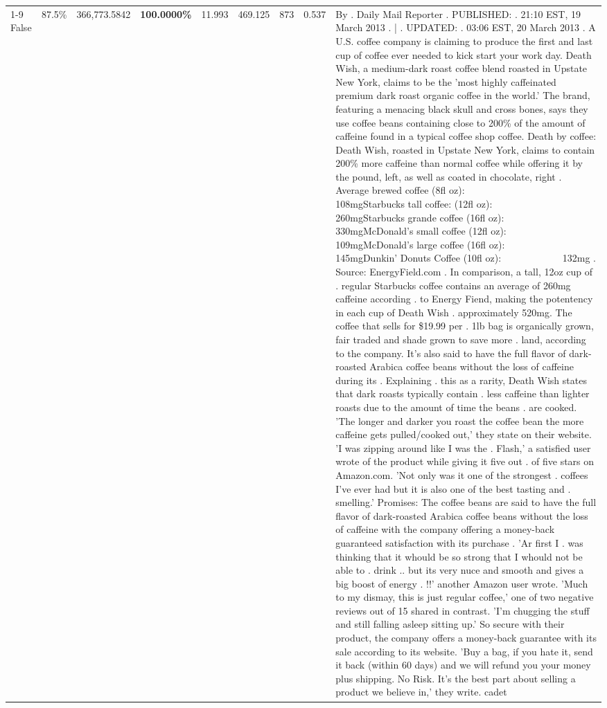 \begin{table}[H]
{\begin{tabular}{lllrlllll}
\cline{1-9}
False & 87.5\% & 366,773.5842 & \bfseries \color{red} 100.0000\% & 11.993 & 469.125 & 873 & 0.537 & By . Daily Mail Reporter . PUBLISHED: . 21:10 EST, 19 March 2013 . | . UPDATED: . 03:06 EST, 20 March 2013 . A U.S. coffee company is claiming to produce the first and last cup of coffee ever needed to kick start your work day. Death Wish, a medium-dark roast coffee blend roasted in Upstate New York, claims to be the 'most highly caffeinated premium dark roast organic coffee in the world.' The brand, featuring a menacing black skull and cross bones, says they use coffee beans containing close to 200\% of the amount of caffeine found in a typical coffee shop coffee. Death by coffee: Death Wish, roasted in Upstate New York, claims to contain 200\% more caffeine than normal coffee while offering it by the pound, left, as well as coated in chocolate, right . Average brewed coffee (8fl oz):              108mgStarbucks tall coffee: (12fl oz):                260mgStarbucks grande coffee (16fl oz):         330mgMcDonald's small coffee (12fl oz):           109mgMcDonald's large coffee (16fl oz):           145mgDunkin' Donuts Coffee (10fl oz):             132mg . Source: EnergyField.com . In comparison, a tall, 12oz cup of . regular Starbucks coffee contains an average of 260mg caffeine according . to Energy Fiend, making the potentency in each cup of Death Wish . approximately 520mg. The coffee that sells for \$19.99 per . 1lb bag is organically grown, fair traded and shade grown to save more . land, according to the company. It's also said to have the full flavor of dark-roasted Arabica coffee beans without the loss of caffeine during its . Explaining . this as a rarity, Death Wish states that dark roasts typically contain . less caffeine than lighter roasts due to the amount of time the beans . are cooked. 'The longer and darker you roast the coffee bean the more caffeine gets pulled/cooked out,' they state on their website. 'I was zipping around like I was the . Flash,' a satisfied user wrote of the product while giving it five out . of five stars on Amazon.com. 'Not only was it one of the strongest . coffees I've ever had but it is also one of the best tasting and . smelling.’ Promises: The coffee beans are said to have the full flavor of dark-roasted Arabica coffee beans without the loss of caffeine with the company offering a money-back guaranteed satisfaction with its purchase . 'Ar first I . was thinking that it whould be so strong that I whould not be able to . drink .. but its very nuce and smooth and gives a big boost of energy . !!' another Amazon user wrote. 'Much to my dismay, this is just regular coffee,' one of two negative reviews out of 15 shared in contrast. 'I'm chugging the stuff and still falling asleep sitting up.' So secure with their product, the company offers a money-back guarantee with its sale according to its website. 'Buy a bag, if you hate it, send it back (within 60 days) and we will refund you your money plus shipping. No Risk. It’s the best part about selling a product we believe in,' they write. cadet \\

\end{tabular}}
\end{table}
